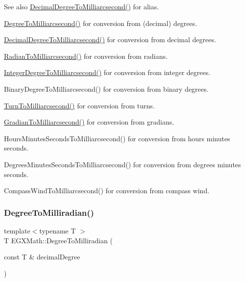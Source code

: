 \begin{DoxySeeAlso}{See also}
\mbox{\hyperlink{group___e_g_x_math-_angle_conversions-_decimal_degree_gadb9ff3c92cf7484793f91e7de80c222e}{Decimal\+Degree\+To\+Milliarcsecond()}} for alias. 

\mbox{\hyperlink{group___e_g_x_math-_angle_conversions-_degree_ga2c218e286b2ef72a00734dbc5a7f5ab6}{Degree\+To\+Milliarcsecond()}} for conversion from (decimal) degrees. 

\mbox{\hyperlink{group___e_g_x_math-_angle_conversions-_decimal_degree_gadb9ff3c92cf7484793f91e7de80c222e}{Decimal\+Degree\+To\+Milliarcsecond()}} for conversion from decimal degrees. 

\mbox{\hyperlink{group___e_g_x_math-_angle_conversions-_radian_ga84fbb494a455cfeb30be62776f96c9a9}{Radian\+To\+Milliarcsecond()}} for conversion from radians. 

\mbox{\hyperlink{group___e_g_x_math-_angle_conversions-_integer_degree_gadc43f22e832cd8fcf16b7bd2269ae348}{Integer\+Degree\+To\+Milliarcsecond()}} for conversion from integer degrees. 

Binary\+Degree\+To\+Milliarcsecond() for conversion from binary degrees. 

\mbox{\hyperlink{group___e_g_x_math-_angle_conversions-_turn_ga05d6fea8f8475831e93dd23f6196393f}{Turn\+To\+Milliarcsecond()}} for conversion from turns. 

\mbox{\hyperlink{group___e_g_x_math-_angle_conversions-_gradian_gad77ea0956413029f4166dce8d7f5ce83}{Gradian\+To\+Milliarcsecond()}} for conversion from gradians. 

Hours\+Minutes\+Seconds\+To\+Milliarcsecond() for conversion from hours minutes seconds. 

Degrees\+Minutes\+Seconds\+To\+Milliarcsecond() for conversion from degrees minutes seconds. 

Compass\+Wind\+To\+Milliarcsecond() for conversion from compass wind. 
\end{DoxySeeAlso}
\mbox{\label{group___e_g_x_math-_angle_conversions-_degree_gae4fa6c2d3805430760783650cfbfdb11}} 
\subsubsection{\texorpdfstring{Degree\+To\+Milliradian()}{DegreeToMilliradian()}}
{\footnotesize\ttfamily template$<$typename T $>$ \\
T E\+G\+X\+Math\+::\+Degree\+To\+Milliradian (\begin{DoxyParamCaption}\item[{const T \&}]{decimal\+Degree }\end{DoxyParamCaption})}



